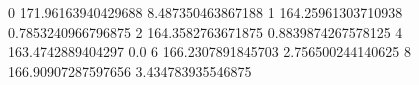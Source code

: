 0 171.96163940429688 8.487350463867188
1 164.25961303710938 0.7853240966796875
2 164.3582763671875 0.8839874267578125
4 163.4742889404297 0.0
6 166.2307891845703 2.756500244140625
8 166.90907287597656 3.434783935546875
